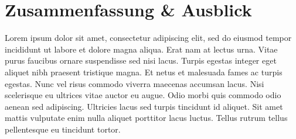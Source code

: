 %
%

\chapter{Zusammenfassung \& Ausblick}
Lorem ipsum dolor sit amet, consectetur adipiscing elit, sed do eiusmod tempor incididunt ut labore et dolore magna aliqua. Erat nam at lectus urna. Vitae purus faucibus ornare suspendisse sed nisi lacus. Turpis egestas integer eget aliquet nibh praesent tristique magna. Et netus et malesuada fames ac turpis egestas. Nunc vel risus commodo viverra maecenas accumsan lacus. Nisi scelerisque eu ultrices vitae auctor eu augue. Odio morbi quis commodo odio aenean sed adipiscing. Ultricies lacus sed turpis tincidunt id aliquet. Sit amet mattis vulputate enim nulla aliquet porttitor lacus luctus. Tellus rutrum tellus pellentesque eu tincidunt tortor.

